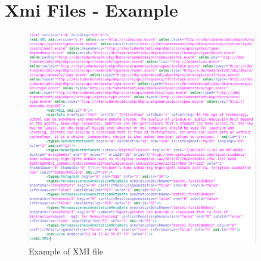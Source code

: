 \chapter{Xmi Files - Example}
\label{sec:xmi}
\begin{figure}[H]
    \centering
    \includegraphics[width=0.9\textwidth]{fig/xmifile.png}
    \caption[Short caption]{Example of XMI file}
    \label{fig:dkpro-overview}
\end{figure}

